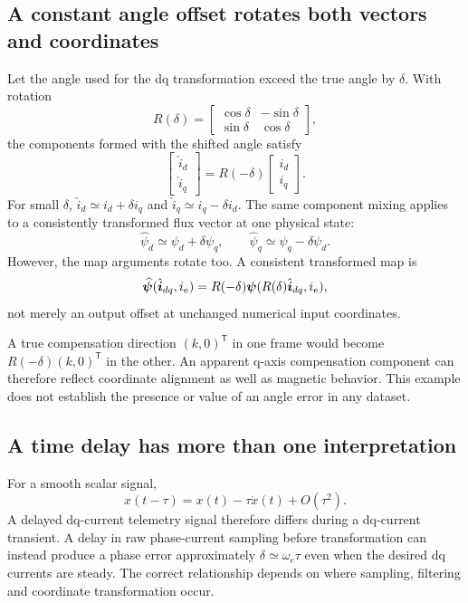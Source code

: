 \subsection{A constant angle offset rotates both vectors and coordinates}
Let the angle used for the dq transformation exceed the true angle by $\delta$. With rotation
\begin{equation}
R(\delta)=\begin{bmatrix}\cos\delta&-\sin\delta\\
\sin\delta&\cos\delta\end{bmatrix},
\end{equation}
the components formed with the shifted angle satisfy
\begin{equation}
\begin{bmatrix}\hat i_d\\\hat i_q\end{bmatrix}
=R(-\delta)\begin{bmatrix}i_d\\i_q\end{bmatrix}.
\end{equation}
For small $\delta$, $\hat i_d\simeq i_d+\delta i_q$ and
$\hat i_q\simeq i_q-\delta i_d$. The same component mixing applies to a consistently transformed flux vector at one physical state:
\begin{equation}
\hat\psi_d\simeq\psi_d+\delta\psi_q,\qquad
\hat\psi_q\simeq\psi_q-\delta\psi_d.
\end{equation}
However, the map arguments rotate too. A consistent transformed map is
\begin{equation}
\widehat{\bm\psi}(\hat{\bm i}_{dq},i_e)
=R(-\delta)\bm\psi(R(\delta)\hat{\bm i}_{dq},i_e),
\end{equation}
not merely an output offset at unchanged numerical input coordinates.

A true compensation direction $(k,0)^{\mathsf T}$ in one frame would become
$R(-\delta)(k,0)^{\mathsf T}$ in the other. An apparent q-axis compensation component can therefore reflect coordinate alignment as well as magnetic behavior. This example does not establish the presence or value of an angle error in any dataset.

\subsection{A time delay has more than one interpretation}
For a smooth scalar signal,
\begin{equation}
x(t-\tau)=x(t)-\tau\dot x(t)+O(\tau^2).
\end{equation}
A delayed dq-current telemetry signal therefore differs during a dq-current transient. A delay in raw phase-current sampling before transformation can instead produce a phase error approximately $\delta\simeq\omega_e\tau$ even when the desired dq currents are steady. The correct relationship depends on where sampling, filtering and coordinate transformation occur.

